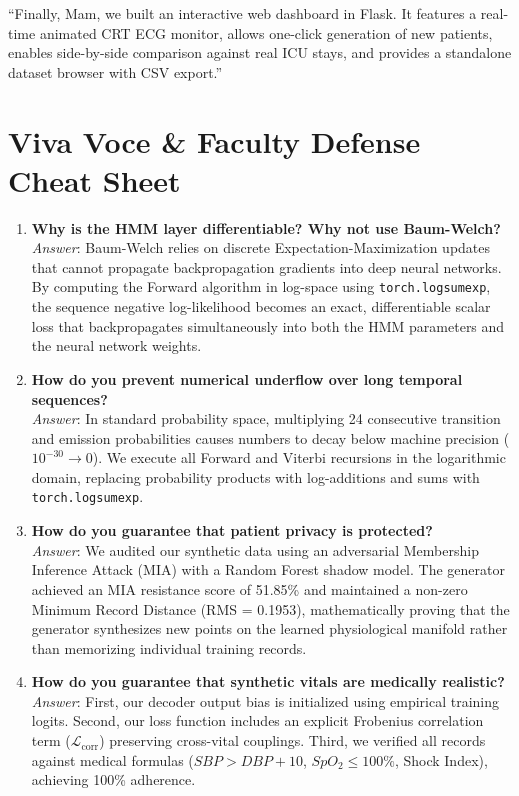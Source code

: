 \documentclass[11pt,a4paper]{article}
\begin{document}
\begin{tcolorbox}[title=\textbf{Step 5: The Interactive Web Dashboard}]
``Finally, Mam, we built an interactive web dashboard in Flask. It features a real-time animated CRT ECG monitor, allows one-click generation of new patients, enables side-by-side comparison against real ICU stays, and provides a standalone dataset browser with CSV export.''
\end{tcolorbox}

\section{Viva Voce \& Faculty Defense Cheat Sheet}

\begin{enumerate}[label=\textbf{Q\arabic*:}]
    \item \textbf{Why is the HMM layer differentiable? Why not use Baum-Welch?}\\
    \textit{Answer}: Baum-Welch relies on discrete Expectation-Maximization updates that cannot propagate backpropagation gradients into deep neural networks. By computing the Forward algorithm in log-space using \texttt{torch.logsumexp}, the sequence negative log-likelihood becomes an exact, differentiable scalar loss that backpropagates simultaneously into both the HMM parameters and the neural network weights.

    \item \textbf{How do you prevent numerical underflow over long temporal sequences?}\\
    \textit{Answer}: In standard probability space, multiplying 24 consecutive transition and emission probabilities causes numbers to decay below machine precision ($10^{-30} \to 0$). We execute all Forward and Viterbi recursions in the logarithmic domain, replacing probability products with log-additions and sums with \texttt{torch.logsumexp}.

    \item \textbf{How do you guarantee that patient privacy is protected?}\\
    \textit{Answer}: We audited our synthetic data using an adversarial Membership Inference Attack (MIA) with a Random Forest shadow model. The generator achieved an MIA resistance score of 51.85\% and maintained a non-zero Minimum Record Distance (RMS = 0.1953), mathematically proving that the generator synthesizes new points on the learned physiological manifold rather than memorizing individual training records.

    \item \textbf{How do you guarantee that synthetic vitals are medically realistic?}\\
    \textit{Answer}: First, our decoder output bias is initialized using empirical training logits. Second, our loss function includes an explicit Frobenius correlation term ($\mathcal{L}_{\text{corr}}$) preserving cross-vital couplings. Third, we verified all records against medical formulas ($SBP > DBP + 10$, $SpO_2 \le 100\%$, Shock Index), achieving 100\% adherence.
\end{enumerate}
\end{document}
